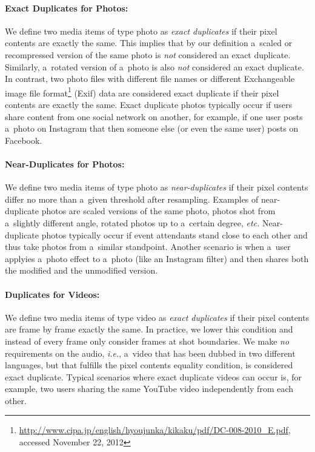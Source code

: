 \paragraph{Exact Duplicates for Photos:}

We define two media items of type photo as \emph{exact duplicates}
if their pixel contents are exactly the same.
This implies that by our definition a~scaled or recompressed version
of the same photo is \emph{not} considered an exact duplicate. 
Similarly, a~rotated version of a~photo is also \emph{not}
considered an exact duplicate. 
In contrast, two photo files with different file names
or different Exchangeable image file
format\footnote{\url{http://www.cipa.jp/english/hyoujunka/kikaku/pdf/DC-008-2010_E.pdf},
accessed November 22, 2012}
(Exif) data are considered exact duplicate
if their pixel contents are exactly the same.
Exact duplicate photos typically occur if users share content 
from one social network on another, for example,
if one user posts a~photo on Instagram that then someone else
(or even the same user) posts on Facebook.

\paragraph{Near-Duplicates for Photos:}

We define two media items of type photo as \emph{near-duplicates}
if their pixel contents differ no more than a~given threshold after resampling.
Examples of near-duplicate photos are scaled versions
of the same photo, photos shot from a~slightly different angle,
rotated photos up to a~certain degree, \emph{etc.}
Near-duplicate photos typically occur if event attendants
stand close to each other and thus take photos
from a~similar standpoint.
Another scenario is when a~user applyies a~photo effect to a~photo
(like an Instagram filter) and then shares both the modified
and the unmodified version.

\paragraph{Duplicates for Videos:}

We define two media items of type video as \emph{exact duplicates}
if their pixel contents are frame by frame exactly the same.
In practice, we lower this condition and instead of every frame
only consider frames at shot boundaries.
We make \emph{no} requirements on the audio, \emph{i.e.},
a~video that has been dubbed in two different languages,
but that fulfills the pixel contents equality condition,
is considered exact duplicate.
Typical scenarios where exact duplicate videos can occur is,
for example, two users sharing the same YouTube video
independently from each other.

